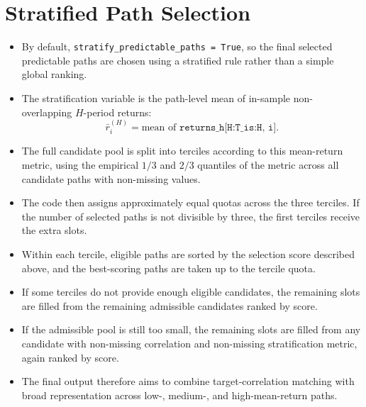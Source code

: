 \documentclass[11pt]{article}
\begin{document}
\section*{Stratified Path Selection}
\begin{itemize}
\item By default, \texttt{stratify\_predictable\_paths = True}, so the final selected predictable paths are chosen using a stratified rule rather than a simple global ranking.
\item The stratification variable is the path-level mean of in-sample non-overlapping \(H\)-period returns:
\[
\bar r_i^{(H)} = \text{mean of } \texttt{returns\_h[H:T\_is:H, i]}.
\]
\item The full candidate pool is split into terciles according to this mean-return metric, using the empirical \(1/3\) and \(2/3\) quantiles of the metric across all candidate paths with non-missing values.
\item The code then assigns approximately equal quotas across the three terciles. If the number of selected paths is not divisible by three, the first terciles receive the extra slots.
\item Within each tercile, eligible paths are sorted by the selection score described above, and the best-scoring paths are taken up to the tercile quota.
\item If some terciles do not provide enough eligible candidates, the remaining slots are filled from the remaining admissible candidates ranked by score.
\item If the admissible pool is still too small, the remaining slots are filled from any candidate with non-missing correlation and non-missing stratification metric, again ranked by score.
\item The final output therefore aims to combine target-correlation matching with broad representation across low-, medium-, and high-mean-return paths.
\end{itemize}
\end{document}
